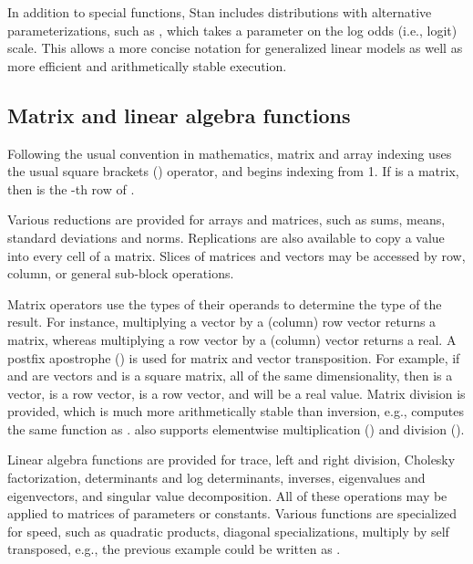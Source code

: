 \documentclass[article]{jss}
\begin{document}
In addition to special functions, Stan includes distributions with
alternative parameterizations, such as , which
takes a parameter on the log odds (i.e., logit) scale.  This allows a
more concise notation for generalized linear models as well as more
efficient and arithmetically stable execution.  


\subsection{Matrix and linear algebra functions}

Following the usual convention in mathematics, matrix and array
indexing uses the usual square brackets (\code{[ ]}) operator, and
begins indexing from 1.  If  is a matrix, then
 is the -th row of .

Various reductions are provided for arrays and matrices, such as sums,
means, standard deviations and norms.  Replications are also available
to copy a value into every cell of a matrix.  Slices of matrices and
vectors may be accessed by row, column, or general sub-block
operations.

Matrix operators use the types of their operands to determine the type
of the result.  For instance, multiplying a vector by a (column) row
vector returns a matrix, whereas multiplying a row vector by a
(column) vector returns a real.  A postfix apostrophe () is
used for matrix and vector transposition.  For example, if 
and  are vectors and  is a square matrix, all of
the same dimensionality, then  is a vector,  is a row vector,  is a row vector, and
 will be a real value.  Matrix
division is provided, which is much more arithmetically stable than
inversion, e.g.,  computes the same function
as .   also supports
elementwise multiplication () and division ().

Linear algebra functions are provided for trace, left and right
division, Cholesky factorization, determinants and log determinants,
inverses, eigenvalues and eigenvectors, and singular value
decomposition.  All of these operations may be applied to matrices of
parameters or constants.  Various functions are specialized for speed,
such as quadratic products, diagonal specializations, multiply by self
transposed, e.g., the previous example could be written as
.
\end{document}
